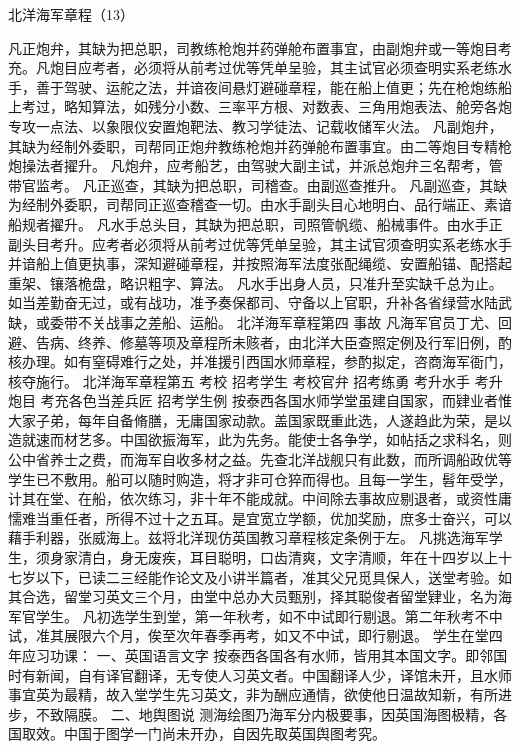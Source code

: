 \documentclass[12pt,UTF8]{ctexbook}
\begin{document}
北洋海军章程（13）

凡正炮弁，其缺为把总职，司教练枪炮并药弹舱布置事宜，由副炮弁或一等炮目考充。凡炮目应考者，必须将从前考过优等凭单呈验，其主试官必须查明实系老练水手，善于驾驶、运舵之法，并谙夜间悬灯避碰章程，能在船上值更；先在枪炮练船上考过，略知算法，如残分小数、三率平方根、对数表、三角用炮表法、舱旁各炮专攻一点法、以象限仪安置炮靶法、教习学徒法、记载收储军火法。
凡副炮弁，其缺为经制外委职，司帮同正炮弁教练枪炮并药弹舱布置事宜。由二等炮目专精枪炮操法者擢升。
凡炮弁，应考船艺，由驾驶大副主试，并派总炮弁三名帮考，管带官监考。
凡正巡查，其缺为把总职，司稽查。由副巡查推升。
凡副巡查，其缺为经制外委职，司帮同正巡查稽查一切。由水手副头目心地明白、品行端正、素谙船规者擢升。
凡水手总头目，其缺为把总职，司照管帆缆、船械事件。由水手正副头目考升。应考者必须将从前考过优等凭单呈验，其主试官须查明实系老练水手并谙船上值更执事，深知避碰章程，并按照海军法度张配绳缆、安置船锚、配搭起重架、镶落桅盘，略识粗字、算法。
凡水手出身人员，只准升至实缺千总为止。如当差勤奋无过，或有战功，准予奏保都司、守备以上官职，升补各省绿营水陆武缺，或委带不关战事之差船、运船。
北洋海军章程第四
事故
凡海军官员丁尤、回避、告病、终养、修墓等项及章程所未赅者，由北洋大臣查照定例及行军旧例，酌核办理。如有窒碍难行之处，并准援引西国水师章程，参酌拟定，咨商海军衙门，核夺施行。
北洋海军章程第五
考校 招考学生 考校官弁 招考练勇 考升水手 考升炮目 考充各色当差兵匠
招考学生例
按泰西各国水师学堂虽建自国家，而肄业者惟大家子弟，每年自备脩膳，无庸国家动款。盖国家既重此选，人遂趋此为荣，是以造就速而材艺多。中国欲振海军，此为先务。能使士各争学，如帖括之求科名，则公中省养士之费，而海军自收多材之益。先查北洋战舰只有此数，而所调船政优等学生已不敷用。船可以随时购造，将才非可仓猝而得也。且每一学生，髫年受学，计其在堂、在船，依次练习，非十年不能成就。中间除去事故应剔退者，或资性庸懦难当重任者，所得不过十之五耳。是宜宽立学额，优加奖励，庶多士奋兴，可以藉手利器，张威海上。兹将北洋现仿英国教习章程核定条例于左。
凡挑选海军学生，须身家清白，身无废疾，耳目聪明，口齿清爽，文字清顺，年在十四岁以上十七岁以下，已读二三经能作论文及小讲半篇者，准其父兄觅具保人，送堂考验。如其合选，留堂习英文三个月，由堂中总办大员甄别，择其聪俊者留堂肄业，名为海军官学生。
凡初选学生到堂，第一年秋考，如不中试即行剔退。第二年秋考不中试，准其展限六个月，俟至次年春季再考，如又不中试，即行剔退。
学生在堂四年应习功课：
一、英国语言文字 按泰西各国各有水师，皆用其本国文字。即邻国时有新闻，自有译官翻译，无专使人习英文者。中国翻译人少，译馆未开，且水师事宜英为最精，故入堂学生先习英文，非为酬应通情，欲使他日温故知新，有所进步，不致隔膜。
二、地舆图说 测海绘图乃海军分内极要事，因英国海图极精，各国取效。中国于图学一门尚未开办，自因先取英国舆图考究。
\end{document}
